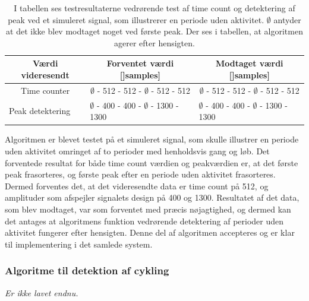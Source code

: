\begin{table}[H]
	\centering
	\begin{tabular}{ccc}
		\hline
		\rowcolor[HTML]{C0C0C0} 
		Værdi videresendt & Forventet værdi {[]}samples{]} & Modtaget værdi {[]}samples{]} \\ \hline
		Time counter & $\emptyset$ - 512 - 512 - $\emptyset$ - 512 - 512 & $\emptyset$ - 512 - 512 - $\emptyset$ - 512 - 512 \\ \hline
		\multicolumn{1}{l}{Peak detektering} &     \multicolumn{1}{l}{$\emptyset$ - 400 - 400 - $\emptyset$ - 1300 - 1300}     &     \multicolumn{1}{l}{$\emptyset$ - 400 - 400 - $\emptyset$ - 1300 - 1300} \\ \hline
	\end{tabular}
	\caption{I tabellen ses testresultaterne vedrørende test af time count og detektering af peak ved et simuleret signal, som illustrerer en periode uden aktivitet. $\emptyset$ antyder at det ikke blev modtaget noget ved første peak. Der ses i tabellen, at algoritmen agerer efter hensigten.}
	\label{tab:test_inaktiv}
\end{table}\vspace{-0.5cm}
Algoritmen er blevet testet på et simuleret signal, som skulle illustrer en periode uden aktivitet omringet af to perioder med henholdsvis gang og løb. Det forventede resultat for både time count værdien og peakværdien er, at det første peak frasorteres, og første peak efter en periode uden aktivitet frasorteres. Dermed forventes det, at det videresendte data er time count på 512, og amplituder som afspejler signalets design på 400 og 1300. Resultatet af det data, som blev modtaget, var som forventet med præcis nøjagtighed, og dermed kan det antages at algoritmens funktion vedrørende detektering af perioder uden aktivitet fungerer efter hensigten. Denne del af algoritmen accepteres og er klar til implementering i det samlede system.

\subsubsection{Algoritme til detektion af cykling}
\textit{Er ikke lavet endnu.}


